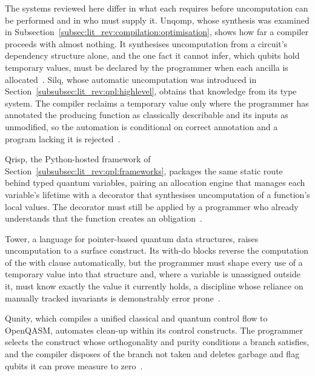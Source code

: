 The systems reviewed here differ in what each requires before uncomputation can be performed and in who must supply it.
Unqomp, whose synthesis was examined in Subsection~\ref{subsec:lit_rev:compilation:optimisation}, shows how far a compiler proceeds with almost nothing.
It synthesises uncomputation from a circuit's dependency structure alone, and the one fact it cannot infer, which qubits hold temporary values, must be declared by the programmer when each ancilla is allocated~\cite{paradis2021unqomp}.
Silq, whose automatic uncomputation was introduced in Section~\ref{subsubsec:lit_rev:qpl:highlevel}, obtains that knowledge from its type system.
The compiler reclaims a temporary value only where the programmer has annotated the producing function as classically describable and its inputs as unmodified, so the automation is conditional on correct annotation and a program lacking it is rejected~\cite{bichsel2020silq}.

Qrisp, the Python-hosted framework of Section~\ref{subsubsec:lit_rev:qpl:frameworks}, packages the same static route behind typed quantum variables, pairing an allocation engine that manages each variable's lifetime with a decorator that synthesises uncomputation of a function's local values.
The decorator must still be applied by a programmer who already understands that the function creates an obligation~\cite{seidel2024qrisp}.

Tower, a language for pointer-based quantum data structures, raises uncomputation to a surface construct.
Its with-do blocks reverse the computation of the with clause automatically, but the programmer must shape every use of a temporary value into that structure and, where a variable is unassigned outside it, must know exactly the value it currently holds, a discipline whose reliance on manually tracked invariants is demonstrably error prone~\cite{yuan2025foundationalabstractions}.

Qunity, which compiles a unified classical and quantum control flow to OpenQASM, automates clean-up within its control constructs.
The programmer selects the construct whose orthogonality and purity conditions a branch satisfies, and the compiler disposes of the branch not taken and deletes garbage and flag qubits it can prove measure to zero~\cite{mints2025qunity}.

